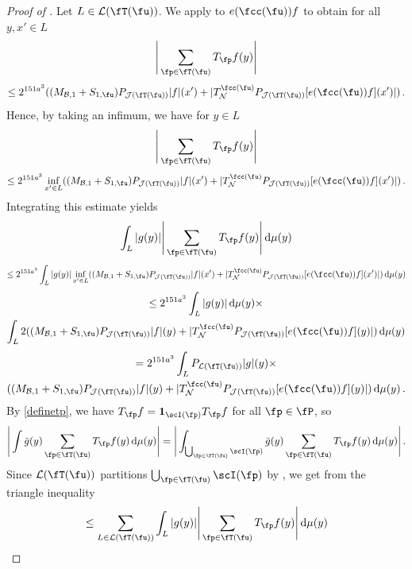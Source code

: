 \begin{proof}[Proof of ]
    Let $L \in \mathcal{L}(\fT(\fu))$.
    We apply  to $e(\fcc(\fu)) f$ to obtain for all $y, x' \in L$
    $$
        \Bigg| \sum_{\fp \in \fT(\fu)} T_{\fp} f(y) \Bigg|
    $$
    $$
        \le 2^{151a^3} ((M_{\mathcal{B},1}+S_{1,\fu})P_{\mathcal{J}(\fT(\fu))}|f|(x')+|T_{\mathcal{N}}^{\fcc(\fu)}P_{\mathcal{J}(\fT(\fu))}[e(\fcc(\fu))f](x')| )\,.
    $$
    Hence, by taking an infimum, we have for $y \in L$
    $$
        \Bigg| \sum_{\fp \in \fT(\fu)} T_{\fp} f(y) \Bigg|
    $$
    $$
        \le 2^{151a^3} \inf_{x' \in L} ((M_{\mathcal{B},1}+S_{1,\fu})P_{\mathcal{J}(\fT(\fu))}|f|(x')+|T_{\mathcal{N}}^{\fcc(\fu)}P_{\mathcal{J}(\fT(\fu))}[e(\fcc(\fu))f](x')| )\,.
    $$
    Integrating this estimate yields
    $$
        \int_L |g(y)| \Bigg| \sum_{\fp \in \fT(\fu)} T_{\fp} f(y) \Bigg| \, \mathrm{d}\mu(y)
    $$
    $$
        \le 2^{151a^3} \int_L |g(y)| \inf_{x' \in L}((M_{\mathcal{B},1}+S_{1,\fu})P_{\mathcal{J}(\fT(\fu))}|f|(x')+|T_{\mathcal{N}}^{\fcc(\fu)}P_{\mathcal{J}(\fT(\fu))}[e(\fcc(\fu))f](x')| ) \, \mathrm{d}\mu(y)
    $$
    \begin{multline*}
        \le 2^{151a^3} \int_L |g(y)| \, \mathrm{d}\mu(y)\times\\
         \int_L 2((M_{\mathcal{B},1}+S_{1,\fu})P_{\mathcal{J}(\fT(\fu))}|f|(y)+|T_{\mathcal{N}}^{\fcc(\fu)}P_{\mathcal{J}(\fT(\fu))}[e(\fcc(\fu))f](y)| ) \, \mathrm{d}\mu(y)
    \end{multline*}
    \begin{multline*}
        = 2^{151a^3 } \int_L P_{\mathcal{L}(\fT(\fu))}|g|(y)\times \\((M_{\mathcal{B},1}+S_{1,\fu})P_{\mathcal{J}(\fT(\fu))}|f|(y)+|T_{\mathcal{N}}^{\fcc(\fu)}P_{\mathcal{J}(\fT(\fu))}[e(\fcc(\fu))f](y)| ) \, \mathrm{d}\mu(y)\,.
    \end{multline*}
    By \eqref{definetp}, we have $T_{\fp} f = \mathbf{1}_{\scI(\fp)} T_{\fp} f$ for all $\fp \in \fP$, so
    $$
        \Bigg| \int \bar g(y) \sum_{\fp \in \fT(\fu)} T_{\fp} f(y) \, \mathrm{d}\mu(y) \Bigg| = \Bigg| \int_{\bigcup_{\fp \in \fT(\fu)} \scI(\fp)} \bar g(y) \sum_{\fp \in \fT(\fu)} T_{\fp} f(y) \, \mathrm{d}\mu(y) \Bigg|\,.
    $$
    Since $\mathcal{L}(\fT(\fu))$ partitions $\bigcup_{\fp \in \fT(\fu)} \scI(\fp)$ by ,
    we get from the triangle inequality
    $$
        \le \sum_{L \in \mathcal{L}(\fT(\fu))} \int_L |g(y)| \Bigg| \sum_{\fp \in \fT(\fu)} T_{\fp} f(y) \Bigg| \, \mathrm{d}\mu(y)
$$
\end{proof}
